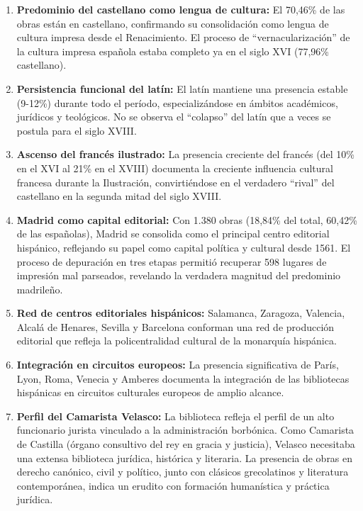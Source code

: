 \documentclass[12pt,a4paper]{article}
\begin{document}
\begin{enumerate}
    \item \textbf{Predominio del castellano como lengua de cultura:} El 70,46\% de las obras están en castellano, confirmando su consolidación como lengua de cultura impresa desde el Renacimiento. El proceso de ``vernacularización'' de la cultura impresa española estaba completo ya en el siglo XVI (77,96\% castellano).

    \item \textbf{Persistencia funcional del latín:} El latín mantiene una presencia estable (9-12\%) durante todo el período, especializándose en ámbitos académicos, jurídicos y teológicos. No se observa el ``colapso'' del latín que a veces se postula para el siglo XVIII.

    \item \textbf{Ascenso del francés ilustrado:} La presencia creciente del francés (del 10\% en el XVI al 21\% en el XVIII) documenta la creciente influencia cultural francesa durante la Ilustración, convirtiéndose en el verdadero ``rival'' del castellano en la segunda mitad del siglo XVIII.

    \item \textbf{Madrid como capital editorial:} Con 1.380 obras (18,84\% del total, 60,42\% de las españolas), Madrid se consolida como el principal centro editorial hispánico, reflejando su papel como capital política y cultural desde 1561. El proceso de depuración en tres etapas permitió recuperar 598 lugares de impresión mal parseados, revelando la verdadera magnitud del predominio madrileño.

    \item \textbf{Red de centros editoriales hispánicos:} Salamanca, Zaragoza, Valencia, Alcalá de Henares, Sevilla y Barcelona conforman una red de producción editorial que refleja la policentralidad cultural de la monarquía hispánica.

    \item \textbf{Integración en circuitos europeos:} La presencia significativa de París, Lyon, Roma, Venecia y Amberes documenta la integración de las bibliotecas hispánicas en circuitos culturales europeos de amplio alcance.

    \item \textbf{Perfil del Camarista Velasco:} La biblioteca refleja el perfil de un alto funcionario jurista vinculado a la administración borbónica. Como Camarista de Castilla (órgano consultivo del rey en gracia y justicia), Velasco necesitaba una extensa biblioteca jurídica, histórica y literaria. La presencia de obras en derecho canónico, civil y político, junto con clásicos grecolatinos y literatura contemporánea, indica un erudito con formación humanística y práctica jurídica.


\end{enumerate}
\end{document}
